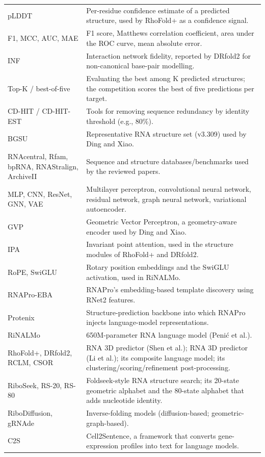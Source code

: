 \documentclass{FastFyp}
\begin{document}
\begin{longtable}{p{} p{}}
pLDDT & Per-residue confidence estimate of a predicted structure, used by RhoFold+ as a confidence signal.\\
F1, MCC, AUC, MAE & F1 score, Matthews correlation coefficient, area under the ROC curve, mean absolute error.\\
INF & Interaction network fidelity, reported by DRfold2 for non-canonical base-pair modelling.\\
Top-K / best-of-five & Evaluating the best among K predicted structures; the competition scores the best of five predictions per target.\\
CD-HIT / CD-HIT-EST & Tools for removing sequence redundancy by identity threshold (e.g., 80\%).\\
BGSU & Representative RNA structure set (v3.309) used by Ding and Xiao.\\
RNAcentral, Rfam, bpRNA, RNAStralign, ArchiveII & Sequence and structure databases/benchmarks used by the reviewed papers.\\
MLP, CNN, ResNet, GNN, VAE & Multilayer perceptron, convolutional neural network, residual network, graph neural network, variational autoencoder.\\
GVP & Geometric Vector Perceptron, a geometry-aware encoder used by Ding and Xiao.\\
IPA & Invariant point attention, used in the structure modules of RhoFold+ and DRfold2.\\
RoPE, SwiGLU & Rotary position embeddings and the SwiGLU activation, used in RiNALMo.\\
RNAPro-EBA & RNAPro's embedding-based template discovery using RNet2 features.\\
Protenix & Structure-prediction backbone into which RNAPro injects language-model representations.\\
RiNALMo & 650M-parameter RNA language model (Peni\'c et al.).\\
RhoFold+, DRfold2, RCLM, CSOR & RNA 3D predictor (Shen et al.); RNA 3D predictor (Li et al.); its composite language model; its clustering/scoring/refinement post-processing.\\
RiboSeek, RS-20, RS-80 & Foldseek-style RNA structure search; its 20-state geometric alphabet and the 80-state alphabet that adds nucleotide identity.\\
RiboDiffusion, gRNAde & Inverse-folding models (diffusion-based; geometric-graph-based).\\
C2S & Cell2Sentence, a framework that converts gene-expression profiles into text for language models.\\
\hline
\end{longtable}
\end{document}

